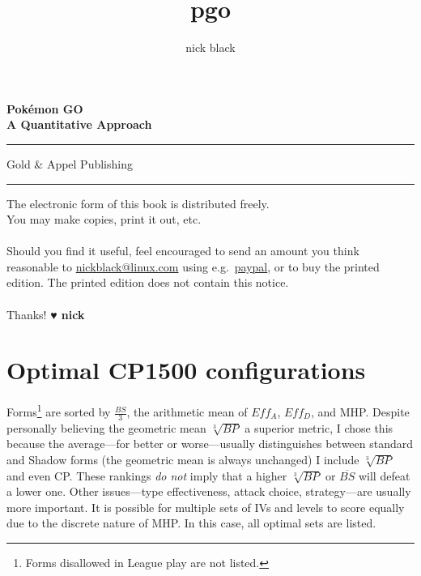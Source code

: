 \documentclass[ebook,10pt,openany,oneside]{memoir}
\title{pgo}
\author{nick black}
\def\LOGO {
  \textbf{
    \Huge Pokémon GO\\
    \Large A Quantitative Approach\\
  }}
\begin{document}
  \pagestyle{empty}
  \begin{center}
  \LOGO
  \vspace{0.5in}
  \end{center}
  \vfill\hrule
  \begin{center}\textsf{Gold \& Appel Publishing}\end{center}
  \hrule
  \clearpage
  \setcounter{page}{1}
  \pagestyle{plain} %

\clearpage
\vfill
\noindent{}The electronic form of this book is distributed freely.\\
You may make copies, print it out, etc.\\
\\
Should you find it useful, feel encouraged to send an amount you think reasonable to
  \href{mailto:nickblack@linux.com}{nickblack@linux.com} using
  e.g.\ \href{https://paypal.me/dankamongmen}{paypal},
  or to buy the printed edition.
The printed edition does not contain this notice.\\
\\
Thanks! {\textbf{{\symbolfont♥} nick}}
\clearpage
\ifdefined\epub
\else
  \hypertarget{toc}{}%
  \tableofcontents*
  \hypertarget{lot}{}%
  \listoftables*
  \fi

\mainmatter















\appendix
\chapter{Optimal CP1500 configurations}
\label{chap:optimal}
Forms\footnote{Forms disallowed in League play are not listed.} are sorted by $\frac{BS}{3}$,
  the arithmetic mean of $Eff_A$, $Eff_D$, and MHP\@.
Despite personally believing the geometric mean $\sqrt[3]{BP}$ a superior metric,
  I chose this because the average---for better or worse---usually
  distinguishes between standard and Shadow forms (the geometric mean is always unchanged)
I include $\sqrt[3]{BP}$ and even CP\@.
These rankings \textit{do not} imply that a higher $\sqrt[3]{BP}$ or $\overline{BS}$
  will defeat a lower one.
Other issues---type effectiveness, attack choice, strategy---are usually more important.
It is possible for multiple sets of IVs and levels to score equally due to the discrete nature of MHP\@.
In this case, all optimal sets are listed.
\end{document}
